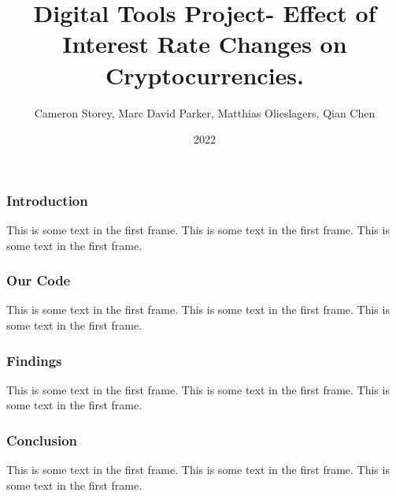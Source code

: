 \documentclass{beamer}
\title{Digital Tools Project- Effect of Interest Rate Changes on Cryptocurrencies.}
\author{Cameron Storey, Marc David Parker, Matthias Olieslagers, Qian Chen}
\institute{UZH}
\date{2022}
\begin{document}
\frame{\titlepage}

\begin{frame}
\frametitle{Introduction}
This is some text in the first frame. This is some text in the first frame. This is some text in the first frame.
\end{frame}

\begin{frame}
    \frametitle{Our Code}
    This is some text in the first frame. This is some text in the first frame. This is some text in the first frame.
\end{frame}

\begin{frame}
    \frametitle{Findings}
    This is some text in the first frame. This is some text in the first frame. This is some text in the first frame.
\end{frame}

\begin{frame}
    \frametitle{Conclusion}
    This is some text in the first frame. This is some text in the first frame. This is some text in the first frame.
\end{frame}
\end{document}
